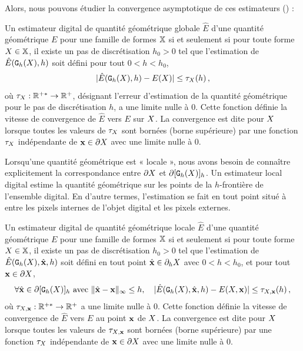 Alors, nous pouvons étudier la convergence asymptotique de ces estimateurs
() :
%
\begin{definition}{}
  \label{def:multigrid-convergence-global}
  Un estimateur digital de quantité géométrique globale $\hat{E}$ d'une quantité géométrique
  $E$  pour une famille de formes $\mathbb{X}$ si
  et seulement si pour toute forme $X \in \mathbb{X}$, il existe un pas de
  discrétisation $h_0 > 0$ tel que l'estimation de $\hat{E}(\mathtt{G}_{h}(X),h)$
  soit défini pour tout $0 < h < h_0$,
  \begin{equation}
    | \hat{E}(\mathtt{G}_{h}(X),h) - E(X) | \le \tau_{X}(h) \,,
  \end{equation}
  où $\tau_{X}: \mathbb{R}^{+*} \rightarrow \mathbb{R}^+$, désignant l'erreur d'estimation
  de la quantité géométrique pour le pas de discrétisation $h$, a une limite
  nulle à $0$. Cette fonction définie la vitesse de convergence de $\hat{E}$
  vers $E$ sur $X$. La convergence est dite  pour
  $X$ lorsque toutes les valeurs de $\tau_{X}$ sont bornées (borne
  supérieure) par une fonction $\tau_{X}$ indépendante de $\mathbf{x} \in \partial X$ avec
  une limite nulle à $0$.
\end{definition}
%
Lorsqu'une quantité géométrique est « locale », nous avons besoin de connaître
explicitement la correspondance entre $\partial X$ et $\partial \lbrack \mathtt{G}_{h}(X) \rbrack_{h}$. Un
estimateur local digital estime la quantité géométrique sur les points de la
$h$-frontière de l'ensemble digital. En d'autre termes, l'estimation se fait en
tout point situé à entre les pixels internes de l'objet digital et les pixels
externes.
%
\begin{definition}{}
  \label{def:multigrid-convergence-local}
  Un estimateur digital de quantité géométrique locale $\hat{E}$ d'une quantité géométrique
  $E$  pour une famille de formes $\mathbb{X}$ si
  et seulement si pour toute forme $X \in \mathbb{X}$, il existe un pas de
  discrétisation $h_0 > 0$ tel que l'estimation de $\hat{E}(\mathtt{G}_{h}(X),\hat{\mathbf{x}},h)$
  soit défini en tout point $\hat{\mathbf{x}} \in \partial_{h} X$ avec $0 < h < h_0$,
  et pour tout $\mathbf{x} \in \partial X$,
  \begin{equation}
    \forall \hat{\mathbf{x}} \in \partial\lbrack \mathtt{G}_{h}(X) \rbrack_{h} \text{~avec~} \| \hat{\mathbf{x}} -\mathbf{x}\|_\infty
    \le h, \quad | \hat{E}(\mathtt{G}_{h}(X),\hat{\mathbf{x}},h) - E(X,\mathbf{x}) | \le \tau_{X,\mathbf{x}}(h) \,,
  \end{equation}
  où $\tau_{X,\mathbf{x}}: \mathbb{R}^{+*} \rightarrow \mathbb{R}^+$ a une limite
  nulle à $0$. Cette fonction définie la vitesse de convergence de $\hat{E}$
  vers $E$ au point $\mathbf{x}$ de $X$. La convergence est dite
   pour $X$ lorsque toutes les valeurs de
  $\tau_{X,\mathbf{x}}$ sont bornées (borne supérieure) par une fonction
  $\tau_{X}$ indépendante de $\mathbf{x} \in \partial X$ avec une limite nulle à $0$.
\end{definition}



